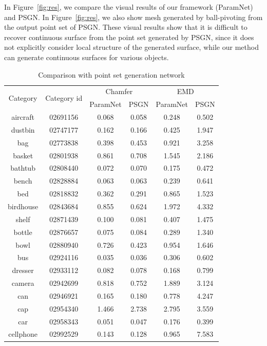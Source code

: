In Figure~\ref{fig:res}, we compare the visual results of our framework (ParamNet) and PSGN\cite{PSGN}. In Figure~\ref{fig:res}, we also show mesh generated by ball-pivoting\cite{ballpivot} from the output point set of PSGN\cite{PSGN}. 
These visual results show that it is difficult to recover continuous surface from the point set generated by PSGN\cite{PSGN}, since it does not explicitly consider local structure of the generated surface, while our method can generate continuous surfaces for various objects.
\begin{table}
	\caption{Comparison with point set generation network\cite{PSGN}}
	\label{tab:seg}
	\centering
	\begin{tabular}{c c c c c c}
		\multirow{2}{*}{Category} & \multirow{2}{*}{Category id} & \multicolumn{2}{c}{Chamfer} & \multicolumn{2}{c}{EMD}\\ \cmidrule(lr){3-4} \cmidrule(lr){5-6}
		&	& ParamNet & PSGN\cite{PSGN}       & ParamNet & PSGN\cite{PSGN}\\
		\hline
		aircraft & 02691156 & 0.068 & 0.058 & 0.248 & 0.502 \\   
		dustbin & 02747177 & 0.162 & 0.166 & 0.425 & 1.947 \\
		bag & 02773838  & 0.398 & 0.453 & 0.921 & 3.258 \\
		basket & 02801938 & 0.861 & 0.708 & 1.545 & 2.186 \\
		bathtub & 02808440 & 0.072 & 0.070 & 0.175 & 0.472 \\
		bench & 02828884 & 0.063 & 0.063 & 0.239 & 0.641 \\
		bed & 02818832 & 0.362 & 0.291 & 0.865 & 1.523 \\
		birdhouse & 02843684 & 0.855 & 0.624 & 1.972 & 4.332 \\
		shelf & 02871439 & 0.100 & 0.081 & 0.407 & 1.475 \\
		bottle & 02876657 & 0.075 & 0.084 & 0.289 & 1.340 \\
		bowl & 02880940 & 0.726 & 0.423 & 0.954 & 1.646 \\
		bus & 02924116 & 0.035 & 0.036 & 0.306 & 0.602\\
		dresser & 02933112 & 0.082 & 0.078 & 0.168 & 0.799 \\
		camera & 02942699 & 0.818 & 0.752 & 1.889 & 3.124 \\
		can & 02946921 & 0.165 & 0.180 & 0.778 & 4.247 \\
		cap & 02954340 & 1.466 & 2.738 & 2.795 & 3.559 \\
		car & 02958343 & 0.051 & 0.047 & 0.176 & 0.399 \\
		cellphone & 02992529 & 0.143  & 0.128  & 0.965  & 7.583 \\
		

\end{tabular}
\end{table}
